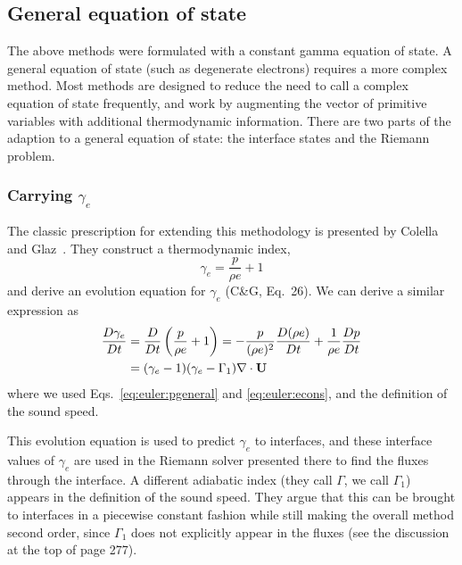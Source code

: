 \subsection{General equation of state}

The above methods were formulated with a constant gamma equation of
state.  A general equation of state (such as degenerate electrons)
requires a more complex method.  Most methods are designed to 
reduce the need to call a complex equation of state frequently,
and work by augmenting the vector of primitive variables with 
additional thermodynamic information.  There are two parts of the 
adaption to a general equation of state: the interface states and 
the Riemann problem. 

\subsubsection{Carrying $\gamma_e$}


The classic prescription for
extending this methodology is presented by Colella and
Glaz~\cite{colellaglaz:1985}.  They construct a thermodynamic index,
\begin{equation}
\gamma_e = \frac{p}{\rho e} + 1
\end{equation}
and derive an evolution equation for $\gamma_e$ (C\&G, Eq.\ 26).
We can derive a similar expression as
\begin{align}
\frac{D\gamma_e}{Dt} &= \frac{D}{Dt} \left ( \frac{p}{\rho e} + 1 \right )
   = - \frac{p}{(\rho e)^2} \frac{D(\rho e)}{Dt} + \frac{1}{\rho e} \frac{Dp}{Dt} \nonumber \\
   &= (\gamma_e - 1) (\gamma_e  - \Gamma_1) \nabla \cdot {\bf U} \label{eq:gammae}
\end{align}
where we used Eqs.~\ref{eq:euler:pgeneral} and \ref{eq:euler:econs}, and the definition
of the sound speed.

This evolution equation is used to predict $\gamma_e$ to interfaces,
and these interface values of $\gamma_e$ are used in the Riemann
solver presented there to find the fluxes through the interface.  A
different adiabatic index (they call $\Gamma$, we call $\Gamma_1$)
appears in the definition of the sound speed.  They argue that this
can be brought to interfaces in a piecewise constant fashion while
still making the overall method second order, since $\Gamma_1$ does
not explicitly appear in the fluxes (see the discussion at the top of
page 277).

